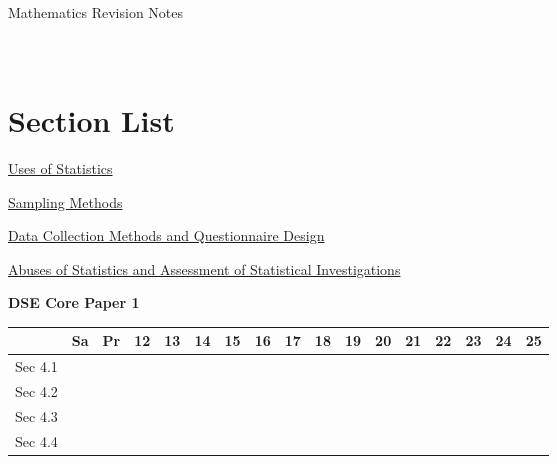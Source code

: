 \documentclass[12pt, a4paper]{article}
\begin{document}
\newpage
\newpage
\thispagestyle{empty}
\begin{center}
Mathematics Revision Notes\\\vspace{1cm}
\\\vspace{1cm}
{\fontsize{24pt}{24pt}\selectfont {Uses and Abuses of Statistics}} \\\vspace{1cm}
\label{chapter:S6-4}

\end{center}
\vspace{0.5cm}
\hline
\section*{Section List}
\begin{enumx}[label=Sec 4.\arabic*\ ]
\item \hyperref[section:6-4-1]{Uses of Statistics}
\item \hyperref[section:6-4-2]{Sampling Methods}
\item \hyperref[section:6-4-3]{Data Collection Methods and Questionnaire Design}
\item \hyperref[section:6-4-4]{Abuses of Statistics and Assessment of Statistical Investigations}
\end{enumx}
\begin{absolutelynopagebreak}
\begin{center}
\textbf{DSE Core Paper 1}
\end{center}
\begin{center}
\begin{tabular}{|l|c|c|c|c|c|c|c|c|c|c|c|c|c|c|c|c|}
\hline
        & Sa & Pr & 12 & 13 & 14 & 15 & 16 & 17 & 18 & 19 & 20 & 21 & 22 & 23 & 24 & 25 \\\hline\hline
Sec 4.1 &  &  &  &  &  &  &  &  &  &  &  &  &  &  &  &  \\\hline
Sec 4.2 &  &  &  &  &  &  &  &  &  &  &  &  &  &  &  &  \\\hline
Sec 4.3 &  &  &  &  &  &  &  &  &  &  &  &  &  &  &  &  \\\hline
Sec 4.4 &  &  &  &  &  &  &  &  &  &  &  &  &  &  &  &  \\\hline
\end{tabular}
\end{center}
\end{absolutelynopagebreak}
\end{document}
